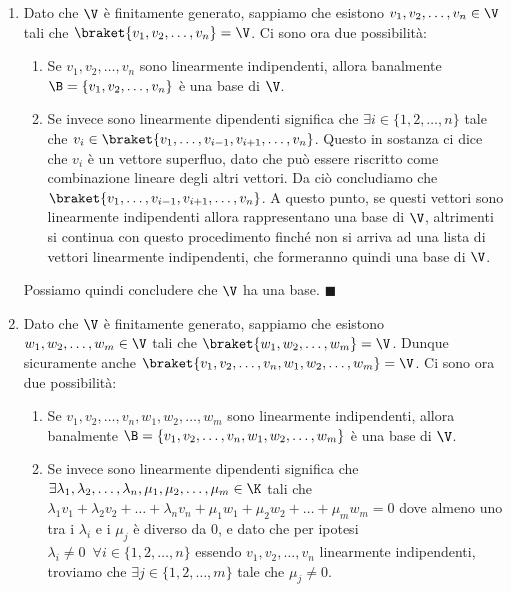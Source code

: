 \documentclass[11pt, a4paper, titlepage, oneside]{scrbook}
\begin{document}
\Dimostrazione \nopagebreak

\begin{enumerate}[label=\Roman*)]
    \item Dato che $\V$ è finitamente generato, sappiamo che esistono $v_1, v_2, \ldots, v_n \in \V$ tali che $\braket{v_1, v_2, \ldots, v_n} = \V$. Ci sono ora due possibilità:
    \begin{enumerate}[label=\arabic*°]
        \item Se $v_1, v_2, \ldots, v_n$ sono linearmente indipendenti, allora banalmente \mbox{$\B = \{v_1, v_2, \ldots, v_n\}$} è una base di $\V$.
        \item Se invece sono linearmente dipendenti significa che $\exists i \in \{1, 2, \ldots, n\}$ tale che \mbox{$v_i \in \braket{v_1, \ldots, v_{i-1}, v_{i+1}, \ldots, v_n}$}. Questo in sostanza ci dice che $v_i$ è un vettore superfluo, dato che può essere riscritto come combinazione lineare degli altri vettori. 
        Da ciò concludiamo che $\braket{v_1, \ldots, v_{i-1}, v_{i+1}, \ldots, v_n}$. A questo punto, se questi vettori sono linearmente indipendenti allora rappresentano una base di $\V$, altrimenti si continua con questo procedimento finché non si arriva ad una lista di vettori linearmente indipendenti, che formeranno quindi una base di $\V$.
    \end{enumerate}
    Possiamo quindi concludere che $\V$ ha una base. $\blacksquare$
    \item Dato che $\V$ è finitamente generato, sappiamo che esistono $w_1, w_2, \ldots, w_m \in \V$ tali che $\braket{w_1, w_2, \ldots, w_m} = \V$. Dunque sicuramente anche $\braket{v_1, v_2, \ldots, v_n, w_1, w_2, \ldots, w_m} = \V$. Ci sono ora due possibilità:
    \begin{enumerate}[label=\arabic*°]
        \item Se $v_1, v_2, \ldots, v_n, w_1, w_2, \ldots, w_m$ sono linearmente indipendenti, allora banalmente \mbox{$\B = \{v_1, v_2, \ldots, v_n, w_1, w_2, \ldots, w_m\}$} è una base di $\V$.
        \item Se invece sono linearmente dipendenti significa che \mbox{$\exists \lambda_1, \lambda_2, \ldots, \lambda_n, \mu_1, \mu_2, \ldots, \mu_m \in \K$} tali che $\lambda_1 v_1 + \lambda_2 v_2 + \ldots + \lambda_n v_n + \mu_1 w_1 + \mu_2 w_2 + \ldots + \mu_m w_m = 0$ dove almeno uno tra i $\lambda_i$ e i $\mu_j$ è diverso da $0$, e dato che per ipotesi $\lambda_i \neq 0 \enspace \forall i \in \{1,2, \ldots, n\}$ essendo $v_1, v_2, \ldots, v_n$ linearmente indipendenti, troviamo che $\exists j \in \{1,2, \ldots, m\}$ tale che $\mu_j \neq 0$. 

\end{enumerate}
\end{enumerate}
\end{document}

